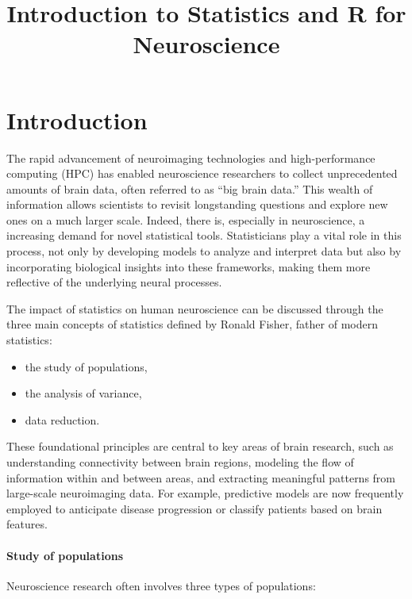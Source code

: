 \documentclass[
]{article}
\title{Introduction to Statistics and R for Neuroscience}
\author{}
\date{\vspace{-2.5em}}
\providecommand{\tightlist}{%
  \setlength{\itemsep}{0pt}\setlength{\parskip}{0pt}}
\begin{document}
\maketitle

{
\setcounter{tocdepth}{2}
\tableofcontents
}
\hypertarget{introduction}{%
\section{Introduction}\label{introduction}}

The rapid advancement of neuroimaging technologies and high-performance
computing (HPC) has enabled neuroscience researchers to collect
unprecedented amounts of brain data, often referred to as ``big brain
data.'' This wealth of information allows scientists to revisit
longstanding questions and explore new ones on a much larger scale.
Indeed, there is, especially in neuroscience, a increasing demand for
novel statistical tools. Statisticians play a vital role in this
process, not only by developing models to analyze and interpret data but
also by incorporating biological insights into these frameworks, making
them more reflective of the underlying neural processes.

The impact of statistics on human neuroscience can be discussed through
the three main concepts of statistics defined by Ronald Fisher, father
of modern statistics:

\begin{itemize}
\tightlist
\item
  the study of populations,
\item
  the analysis of variance,
\item
  data reduction.
\end{itemize}

These foundational principles are central to key areas of brain
research, such as understanding connectivity between brain regions,
modeling the flow of information within and between areas, and
extracting meaningful patterns from large-scale neuroimaging data. For
example, predictive models are now frequently employed to anticipate
disease progression or classify patients based on brain features.

\hypertarget{study-of-populations}{%
\paragraph{Study of populations}\label{study-of-populations}}

Neuroscience research often involves three types of populations:
\end{document}

